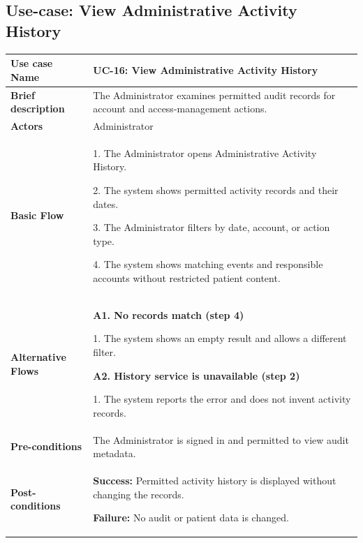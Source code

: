 \clearpage
\subsection{Use-case: View Administrative Activity History}
\label{uc:uc-16}
\begin{longtable}{|p{}|p{}|}
\hline
\textbf{Use case Name} & UC-16: View Administrative Activity History \\ \hline
\textbf{Brief description} & The Administrator examines permitted audit records for account and access-management actions. \\ \hline
\textbf{Actors} & Administrator \\ \hline
\textbf{Basic Flow} &
1. The Administrator opens Administrative Activity History.\par
2. The system shows permitted activity records and their dates.\par
3. The Administrator filters by date, account, or action type.\par
4. The system shows matching events and responsible accounts without restricted patient content.
\\ \hline
\textbf{Alternative Flows} &
\textbf{A1. No records match (step 4)}\par
1. The system shows an empty result and allows a different filter.
\par\smallskip
\textbf{A2. History service is unavailable (step 2)}\par
1. The system reports the error and does not invent activity records.
\\ \hline
\textbf{Pre-conditions} & The Administrator is signed in and permitted to view audit metadata. \\ \hline
\textbf{Post-conditions} & \textbf{Success:} Permitted activity history is displayed without changing the records.\par
\textbf{Failure:} No audit or patient data is changed. \\ \hline
\end{longtable}


\clearpage
